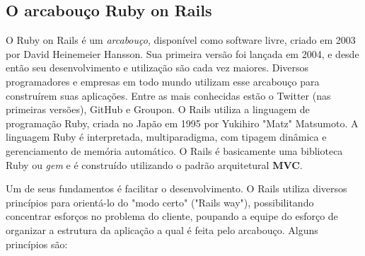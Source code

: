 \subsection{O arcabouço Ruby on Rails}
\label{subsec-rails}

O Ruby on Rails é um \textit{arcabouço}, disponível como software livre, criado em 2003 por David Heinemeier Hansson.
%
Sua primeira versão foi lançada em 2004, e desde então seu desenvolvimento e utilização são cada vez maiores.
%
Diversos programadores e empresas em todo mundo utilizam esse arcabouço para construírem suas aplicações. Entre as mais conhecidas estão o Twitter (nas primeiras versões), GitHub e Groupon. 
%
O Rails utiliza a linguagem de programação Ruby, criada no Japão em 1995 por Yukihiro "Matz" Matsumoto. A linguagem Ruby é interpretada, multiparadigma, com tipagem dinâmica e gerenciamento de memória automático. O Rails é basicamente uma biblioteca Ruby ou \textit{gem} e é construído utilizando o padrão arquitetural \textbf{MVC}.

Um de seus fundamentos é facilitar o desenvolvimento. O Rails utiliza diversos princípios para orientá-lo do "modo certo" ("Rails way"), possibilitando concentrar esforços no problema do cliente, poupando a equipe do esforço de organizar a estrutura da aplicação a qual é feita pelo arcabouço. Alguns princípios são:


